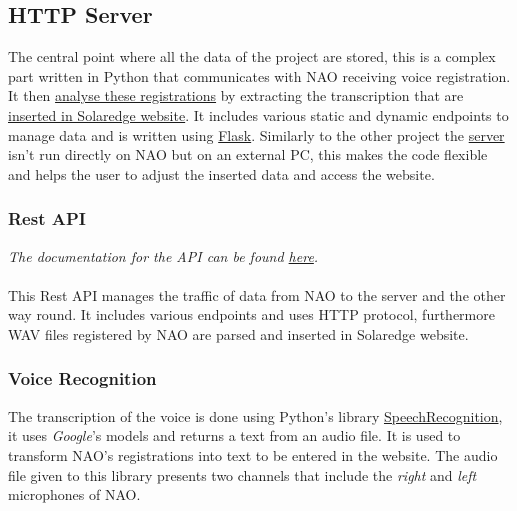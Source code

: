 \documentclass{optica-article}
\begin{document}
\vspace{12pt}
\subsection{HTTP Server}\label{sec:solaedge_server}
The central point where all the data of the project are stored, this is a complex part written in Python that communicates with NAO receiving voice registration. It then \hyperref[sec:solaredge_voice_recognition]{analyse these registrations} by extracting the transcription that are \hyperref[sec:solaredge_website_control]{inserted in Solaredge website}. It includes various static and dynamic endpoints to manage data and is written using \href{https://flask.palletsprojects.com/en/2.2.x/}{Flask}. Similarly to the other project the \hyperref[sec:solaedge_server]{server} isn't run directly on NAO but on an external PC, this makes the code flexible and helps the user to adjust the inserted data and access the website.

\vspace{8pt}
\subsubsection{Rest API}\label{sec:solaredge_rest_api}
\textit{The documentation for the API can be found \href{https://naonexus.notion.site/Solaredge-server-1bae2ae87b4d407b82f5a50bbfe3d87c}{here}.}\\
\\This Rest API manages the traffic of data from NAO to the server and the other way round. It includes various endpoints and uses HTTP protocol, furthermore WAV files registered by NAO are parsed and inserted in Solaredge website.

\vspace{8pt}
\subsubsection{Voice Recognition}\label{sec:solaredge_voice_recognition}
The transcription of the voice is done using Python's library \href{https://pypi.org/project/SpeechRecognition/}{SpeechRecognition}, it uses \emph{Google}'s models and returns a text from an audio file. It is used to transform NAO's registrations into text to be entered in the website. The audio file given to this library presents two channels that include the \emph{right} and \emph{left} microphones of NAO.

\vspace{8pt}
\end{document}
